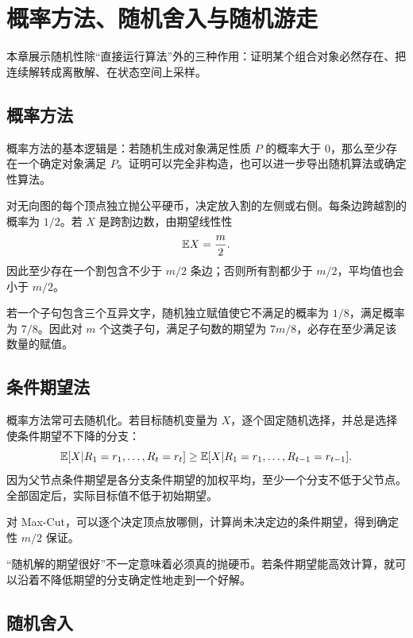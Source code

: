 \chapter{概率方法、随机舍入与随机游走}

本章展示随机性除“直接运行算法”外的三种作用：证明某个组合对象必然存在、把连续解转成离散解、在状态空间上采样。

\section{概率方法}

概率方法的基本逻辑是：若随机生成对象满足性质 $P$ 的概率大于 0，那么至少存在一个确定对象满足 $P$。证明可以完全非构造，也可以进一步导出随机算法或确定性算法。

\begin{example}
对无向图的每个顶点独立抛公平硬币，决定放入割的左侧或右侧。每条边跨越割的概率为 $1/2$。若 $X$ 是跨割边数，由期望线性性
\[
\mathbb{E} X=\frac m2.
\]
因此至少存在一个割包含不少于 $m/2$ 条边；否则所有割都少于 $m/2$，平均值也会小于 $m/2$。
\end{example}

\begin{example}
若一个子句包含三个互异文字，随机独立赋值使它不满足的概率为 $1/8$，满足概率为 $7/8$。因此对 $m$ 个这类子句，满足子句数的期望为 $7m/8$，必存在至少满足该数量的赋值。
\end{example}

\section{条件期望法}

概率方法常可去随机化。若目标随机变量为 $X$，逐个固定随机选择，并总是选择使条件期望不下降的分支：
\[
\mathbb{E}[X|R_1=r_1,\dots,R_t=r_t]
\ge
\mathbb{E}[X|R_1=r_1,\dots,R_{t-1}=r_{t-1}].
\]
因为父节点条件期望是各分支条件期望的加权平均，至少一个分支不低于父节点。全部固定后，实际目标值不低于初始期望。

对 Max-Cut，可以逐个决定顶点放哪侧，计算尚未决定边的条件期望，得到确定性 $m/2$ 保证。

\begin{intuitionbox}
“随机解的期望很好”不一定意味着必须真的抛硬币。若条件期望能高效计算，就可以沿着不降低期望的分支确定性地走到一个好解。
\end{intuitionbox}

\section{随机舍入}

